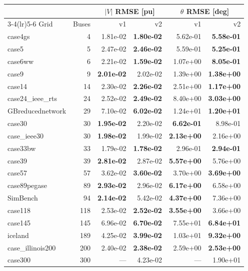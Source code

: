 \documentclass[10pt]{article}
\begin{document}
\begin{table}[H]
\centering\small
\begin{tabular}{lr rr rr}
\toprule
 & & \multicolumn{2}{c}{$|V|$ RMSE [pu]} & \multicolumn{2}{c}{$\theta$ RMSE [deg]} \\
\cmidrule(lr){3-4}\cmidrule(lr){5-6}
Grid & Buses & v1 & v2 & v1 & v2 \\
\midrule
case4gs & 4 & 1.81e-02 & \textbf{1.80e-02} & 5.62e-01 & \textbf{5.58e-01} \\
case5 & 5 & 2.47e-02 & \textbf{2.46e-02} & 5.59e-01 & \textbf{5.25e-01} \\
case6ww & 6 & 2.21e-02 & \textbf{1.59e-02} & 1.07e+00 & \textbf{8.05e-01} \\
case9 & 9 & \textbf{2.01e-02} & 2.02e-02 & 1.39e+00 & \textbf{1.38e+00} \\
case14 & 14 & 2.30e-02 & \textbf{2.26e-02} & 2.51e+00 & \textbf{1.17e+00} \\
case24\_ieee\_rts & 24 & 2.52e-02 & \textbf{2.49e-02} & 8.40e+00 & \textbf{3.03e+00} \\
GBreducednetwork & 29 & 7.10e-02 & \textbf{6.02e-02} & 1.24e+01 & \textbf{1.20e+01} \\
case30 & 30 & \textbf{1.95e-02} & 2.20e-02 & \textbf{6.62e-01} & 8.98e-01 \\
case\_ieee30 & 30 & \textbf{1.98e-02} & 1.99e-02 & \textbf{2.13e+00} & 2.16e+00 \\
case33bw & 33 & 1.79e-02 & \textbf{1.78e-02} & 2.96e-01 & \textbf{2.94e-01} \\
case39 & 39 & \textbf{2.81e-02} & 2.87e-02 & \textbf{5.57e+00} & 5.76e+00 \\
case57 & 57 & 3.62e-02 & \textbf{3.60e-02} & 3.70e+00 & \textbf{3.69e+00} \\
case89pegase & 89 & \textbf{2.93e-02} & 2.96e-02 & \textbf{6.17e+00} & 6.58e+00 \\
SimBench & 94 & \textbf{2.14e-02} & 5.42e-02 & \textbf{4.37e+00} & 7.36e+00 \\
case118 & 118 & 2.53e-02 & \textbf{2.52e-02} & \textbf{3.55e+00} & 3.66e+00 \\
case145 & 145 & 6.96e-02 & \textbf{6.70e-02} & 7.55e+01 & \textbf{6.84e+01} \\
iceland & 189 & 4.25e-02 & \textbf{3.99e-02} & 1.03e+01 & \textbf{9.32e+00} \\
case\_illinois200 & 200 & 2.40e-02 & \textbf{2.38e-02} & 2.59e+00 & \textbf{2.53e+00} \\
case300 & 300 & --- & 4.23e-02 & --- & 1.90e+01 \\

\end{tabular}
\end{table}
\end{document}
